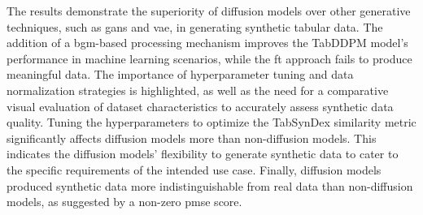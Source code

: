 The results demonstrate the superiority of diffusion models over other generative techniques, such as \Glspl{gan} and \gls{vae}, in generating synthetic tabular data.
The addition of a \gls{bgm}-based processing mechanism improves the TabDDPM \gls{model}'s performance in machine learning scenarios, while the \gls{ft} approach fails to produce meaningful data. 
The importance of hyperparameter tuning and data normalization strategies is highlighted, as well as the need for a comparative visual evaluation of dataset characteristics to accurately assess synthetic data quality. 
Tuning the hyperparameters to optimize the TabSynDex similarity metric significantly affects diffusion models more than non-diffusion models. 
This indicates the diffusion models' flexibility to generate synthetic data to cater to the specific requirements of the intended use case.
Finally, diffusion models produced synthetic data more indistinguishable from real data than non-diffusion models, as suggested by a non-zero \gls{pmse} score.

\cleardoublepage 
